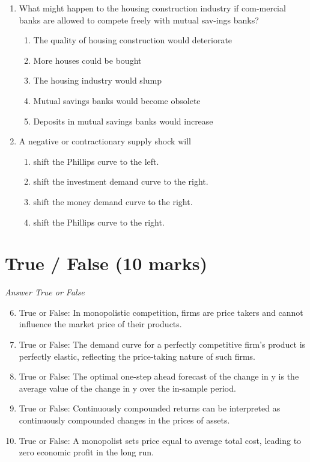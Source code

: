 \documentclass[12pt]{article}
\begin{document}
\begin{enumerate}[label=\arabic*.]
\begin{enumerate}[label=(\alph*)]
\end{enumerate}
\item What might happen to the housing construction industry if com-mercial banks are allowed to compete freely with mutual sav-ings banks?
\begin{enumerate}[label=(\alph*)]
    \item The quality of housing construction would deteriorate
    \item More houses could be bought
    \item The housing industry would slump
    \item Mutual savings banks would become obsolete
    \item Deposits in mutual savings banks would increase
\end{enumerate}
\item A negative or contractionary supply shock will
\begin{enumerate}[label=(\alph*)]
    \item shift the Phillips curve to the left.
    \item shift the investment demand curve to the right.
    \item shift the money demand curve to the right.
    \item shift the Phillips curve to the right.
\end{enumerate}
\end{enumerate}

\section*{True / False (10 marks)}
\textit{Answer True or False}
\begin{enumerate}[label=\arabic*.]
\setcounter{enumi}{5}
\item True or False: In monopolistic competition, firms are price takers and cannot influence the market price of their products.
\item True or False: The demand curve for a perfectly competitive firm's product is perfectly elastic, reflecting the price-taking nature of such firms.
\item True or False: The optimal one-step ahead forecast of the change in y is the average value of the change in y over the in-sample period.
\item True or False: Continuously compounded returns can be interpreted as continuously compounded changes in the prices of assets.
\item True or False: A monopolist sets price equal to average total cost, leading to zero economic profit in the long run.
\end{enumerate}
\end{document}

